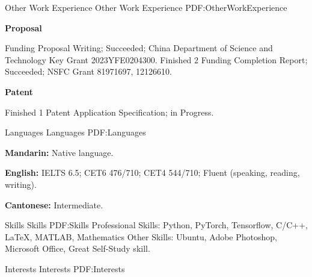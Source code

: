 \documentclass[a4paper,MMMyyyy,nonstopmode]{simpleresumecv}
\begin{document}
\begin{Body}
\Section
{{\large Other Work\newline
Experience}}
{{\large Other Work Experience}}
{PDF:OtherWorkExperience}


\Gap
\BulletItem
\textbf{Proposal}
\hfill
\begin{Detail}
\SubBulletItem
Funding Proposal Writing; Succeeded; China Department of Science and Technology Key Grant 2023YFE0204300.
\SubBulletItem
Finished 2 Funding Completion Report; Succeeded; NSFC Grant 81971697, 12126610.
\end{Detail}
\Gap
\BulletItem
\textbf{Patent}
\hfill
\begin{Detail}
    \SubBulletItem
    Finished 1 Patent Application Specification; in Progress.
\end{Detail}


\Section
{{\large Languages}}
{{\large Languages}}
{PDF:Languages}

\BulletItem
\textbf{Mandarin:} Native language.

\Gap
\BulletItem
\textbf{English:} IELTS 6.5; CET6 476/710; CET4 544/710; Fluent (speaking, reading, writing).

\Gap
\BulletItem
\textbf{Cantonese:} Intermediate.


\Section
{{\large Skills}}
{{\large Skills}}
{PDF:Skills}
\Entry
\BulletItem
Professional Skills:
\SubBulletItem
Python, PyTorch, Tensorflow, 
C/C++, 
{\LaTeX}, 
MATLAB, 
Mathematics
\BulletItem
Other Skills:
\SubBulletItem
Ubuntu, 
Adobe Photoshop, 
Microsoft Office, 
Great Self-Study skill.


\BigGap
\Section
{{\large Interests}}
{{\large Interests}}
{PDF:Interests}


\end{Body}
\end{document}
